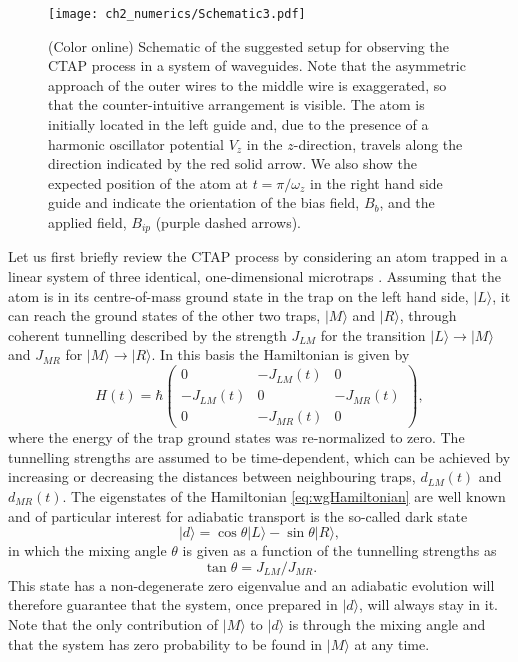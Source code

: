 \begin{figure}[tb]
  \texttt{[image: ch2\_numerics/Schematic3.pdf]}
  \caption{(Color online) Schematic of the suggested setup for observing the CTAP process in a system of waveguides. Note that the asymmetric approach of the outer wires to the middle wire is exaggerated, so that the counter-intuitive arrangement is visible. The atom is initially located in the left guide and, due to the presence of a harmonic oscillator potential $V_{z}$ in the $z$-direction, travels along the direction indicated by the red solid arrow. We also show the expected position of the atom at $t=\pi/{\omega_z}$ in the right hand side guide and indicate the orientation of the bias field, $B_b$, and the applied field, $B_{ip}$ (purple dashed arrows).}
  \label{fig:Schematic}
\end{figure}

Let us first briefly review the CTAP process by considering an atom trapped in a linear system of three
identical, one-dimensional microtraps \cite{Eckert:04}.  Assuming that the atom is in its centre-of-mass ground state in the trap on the left hand side,
$|L\rangle$, it can reach the ground states of the other two traps, $|M\rangle$ and $|R\rangle$, through coherent tunnelling described by the strength $J_{LM}$ for the transition $\vert L \rangle\to\vert M \rangle$ and $J_{MR}$ for $\vert M \rangle\to\vert R
\rangle$. In this basis the Hamiltonian is given by
\begin{equation}
  \label{eq:wgHamiltonian}
  H(t)=\hbar\begin{pmatrix}
                    0             & -J_{LM}(t) & 0  \\
                   -J_{LM}(t)  & 0            & -J_{MR}(t) \\
                    0             & -J_{MR}(t) & 0
  \end{pmatrix} ,
\end{equation}
where the energy of the trap ground states was re-normalized to zero. The tunnelling strengths are assumed to be time-dependent, which can be achieved by increasing or decreasing the distances between neighbouring traps, $d_{LM}(t)$ and $d_{MR}(t)$. The eigenstates of the Hamiltonian \eqref{eq:wgHamiltonian} are well known \cite{Bergmann:98} and of particular interest for adiabatic transport is the so-called dark state
\begin{equation}
  |d\rangle=\cos\theta|L\rangle-\sin\theta|R\rangle,
\end{equation}
in which the  mixing angle $\theta$ is given as a function of the tunnelling strengths as
\begin{equation}
  \tan\theta=J_{LM}/J_{MR}.
\end{equation}
This state has a non-degenerate zero eigenvalue and an adiabatic evolution will therefore guarantee that the system, once prepared in
$|d\rangle$, will always stay in it. Note that the only contribution of $|M\rangle$ to $|d\rangle$ is through the mixing angle and that the system has zero probability to be found in $|M\rangle$ at any time.

